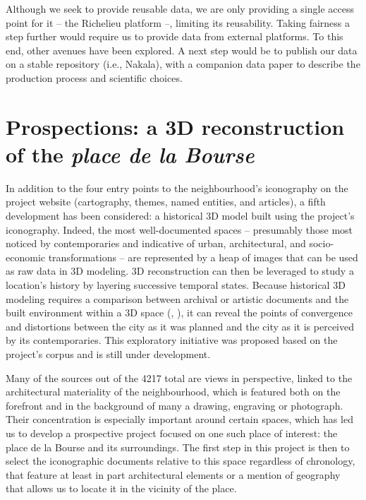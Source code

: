 \documentclass[12pt, a4paper, twocolumn]{article}
\begin{document}
Although we seek to provide reusable data, we are only providing a single access point for it -- the Richelieu platform --, limiting its reusability. Taking \acs{fair}ness a step further would require us to provide data from external platforms. To this end, other avenues have been explored. A next step would be to publish our data on a stable repository (i.e., Nakala), with a companion data paper to describe the production process and scientific choices.

\section{Prospections: a 3D reconstruction of the \textit{place de la Bourse}}

In addition to the four entry points to the neighbourhood's iconography on the project website (cartography, themes, named entities, and articles), a fifth development has been considered: a historical 3D model built using the project's iconography. Indeed, the most well-documented spaces -- presumably those most noticed by contemporaries and indicative of urban, architectural, and socio-economic transformations -- are represented by a heap of images that can be used as raw data in 3D modeling. 3D reconstruction can then be leveraged to study a location's history by layering successive temporal states.  Because historical 3D modeling requires a comparison between archival or artistic documents and the built environment within a 3D space (\cite{aubryPaintingto3DModelAlignment2014}, \cite{aubryPaintingto3DModelAlignment2014}), it can reveal the points of convergence and distortions between the city as it was planned and the city as it is perceived by its contemporaries. This exploratory initiative was proposed based on the project's corpus and is still under development. 

Many of the sources out of the 4217 total are views in perspective, linked to the architectural materiality of the neighbourhood, which is featured both on the forefront and in the background of many a drawing, engraving or photograph. Their concentration is especially important around certain spaces, which has led us to develop a prospective project focused on one such place of interest: the place de la Bourse and its surroundings. The first step in this project is then to select the iconographic documents relative to this space regardless of chronology, that feature at least in part architectural elements or a mention of geography that allows us to locate it in the vicinity of the place.
\end{document}
